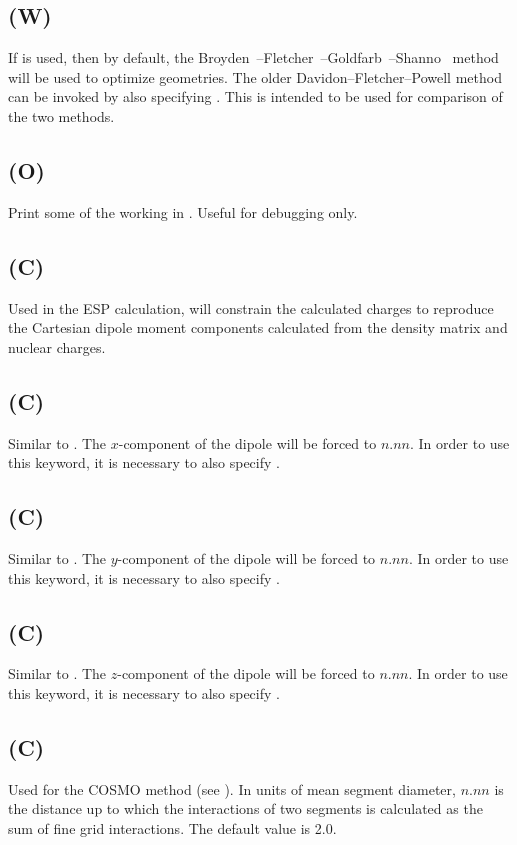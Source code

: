 \subsection*{ (W)}
If  is used, then by default, the
Broyden~\cite{bfgs1}--Fletcher~\cite{bfgs2}--Goldfarb~\cite{bfgs3}--Shanno~\cite{bfgs4}
method will be  used to  optimize geometries.  The older
Davidon--Fletcher--Powell method can be invoked by also specifying .
This is intended to be used for  comparison of the two methods.

\subsection*{ (O)}
Print some of the working in .  Useful for debugging only.

\subsection*{ (C)}
Used in the ESP calculation,  will  constrain  the  calculated
charges  to  reproduce  the Cartesian dipole moment components calculated from
the density matrix and nuclear charges.

\subsection*{ (C)}
Similar to .  The $x$-component of the dipole will be forced to
$n.nn$.  In order to use this keyword, it is necessary to  also specify
.

\subsection*{ (C)}
Similar to .  The $y$-component of the dipole will be forced to
$n.nn$.  In order to use this keyword, it is necessary to  also specify
.

\subsection*{ (C)}
Similar to .  The $z$-component of the dipole will be forced to
$n.nn$.  In order to use this keyword, it is necessary to  also specify
.

\subsection*{ (C)}
Used for the COSMO method (see ).  In units of mean segment diameter,
$n.nn$ is the distance up to which the interactions of two segments is
calculated as the sum of fine grid interactions. The default value is 2.0.

